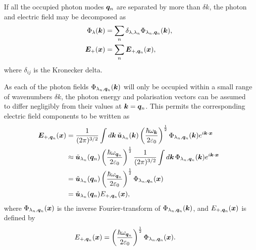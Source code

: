If all the occupied photon modes $\bm{q}_n$ are separated by more than $\delta k$, the photon and electric field may be decomposed as
\begin{align}
    \Phi_\lambda(\bm{k}) &= \sum_n \delta_{\lambda, \lambda_n} \Phi_{\lambda_n,\bm{q}_n}(\bm{k}), \\
    \bm{E}_+(\bm{x}) &= \sum_n \bm{E}_{+,\bm{q}_n}(\bm{x}),
\end{align}
where $\delta_{ij}$ is the Kronecker delta.

As each of the photon fields $\Phi_{\lambda_n, \bm{q}_n}(\bm{k})$ will only be occupied within a small range of wavenumbers $\delta k$, the photon energy and polarisation vectors can be assumed to differ negligibly from their values at $\bm{k}=\bm{q}_n$. This permits the corresponding electric field components to be written as
\begin{align}
    \bm{E}_{+, \bm{q}_n}(\bm{x}) &= \frac{1}{(2\pi)^{3/2}} \int d \bm{k}\, \check{\bm{u}}_{\lambda_n} (\bm{k}) \left(\frac{\hbar \omega_{\bm{k}}}{2\varepsilon_0}\right)^{\frac{1}{2}} \Phi_{\lambda_n, \bm{q}_n}(\bm{k}) e^{i \bm{k}\cdot \bm{x}} \notag\\
    &\approx \check{\bm{u}}_{\lambda_n}(\bm{q}_n) \left( \frac{\hbar \omega_{\bm{q}_n}}{2\varepsilon_0}\right)^{\frac{1}{2}}   \frac{1}{(2\pi)^{3/2}} \int d \bm{k}\, \Phi_{\lambda_n, \bm{q}_n}(\bm{k}) e^{i \bm{k}\cdot \bm{x}}\notag\\
   &= \check{\bm{u}}_{\lambda_n}(\bm{q}_n) \left( \frac{\hbar \omega_{\bm{q}_n}}{2\varepsilon_0}\right)^{\frac{1}{2}} \Phi_{\lambda_n, \bm{q}_n} (\bm{x}) \notag\\
   &= \check{\bm{u}}_{\lambda_n}(\bm{q}_n) E_{+, \bm{q}_n}(\bm{x}),
\end{align}
where $\Phi_{\lambda_n, \bm{q}_n}(\bm{x})$ is the inverse Fourier-transform of $\Phi_{\lambda_n, \bm{q}_n}(\bm{k})$, and $E_{+, \bm{q}_n}(\bm{x})$ is defined by
\begin{align}
    E_{+, \vect{q}_n}(\vect{x}) &= \left( \frac{\hbar \omega_{\vect{q}_n}}{2 \varepsilon_0}\right)^{\frac{1}{2}} \Phi_{\lambda_n, \vect{q}_n}(\vect{x}).\label{OpticalPumping:ElectricFieldPhotonFieldRelationship}
\end{align}

